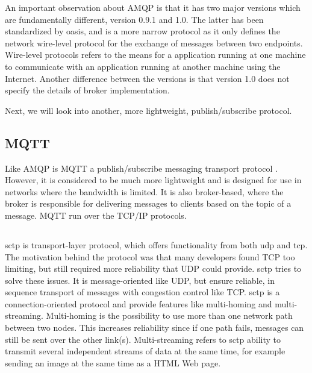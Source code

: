 An important observation about AMQP is that it has two major versions which are
fundamentally different, version 0.9.1 and 1.0. The latter has been standardized
by \gls{oasis}\cite{oasis-amqp}, and is a  more narrow protocol as it only defines the network
wire-level protocol for the exchange of messages between two endpoints.
Wire-level protocols refers to the means for a application running at one
machine to communicate with an application running at another machine using the
Internet. Another difference between the versions is that version 1.0 does not
specify the details of broker implementation.

Next, we will look into another, more lightweight, publish/subscribe protocol.

\subsection{MQTT}

Like AMQP is MQTT a publish/subscribe messaging transport protocol
\cite{oasis-mqtt}. However, it is considered to be much more lightweight and is
designed for use in networks where the bandwidth is limited. It is also
broker-based, where the broker is responsible for delivering messages to clients
based on the topic of a message. MQTT run over the TCP/IP protocols.



\subsection{}

\gls{sctp} is transport-layer protocol, which offers functionality from both
\gls{udp} and \gls{tcp}\cite{rfc-sctp}. The motivation behind the protocol was
that many developers found TCP too limiting, but still required more reliability
that UDP could provide. \gls{sctp} tries to solve these issues. It is
message-oriented like UDP, but ensure reliable, in sequence transport of
messages with congestion control like TCP. \gls{sctp} is a connection-oriented
protocol and provide features like multi-homing and multi-streaming.
Multi-homing is the possibility to use more than one network path between two
nodes. This increases reliability since if one path fails, messages can still be
sent over the other link(s). Multi-streaming refers to \gls{sctp} ability to
transmit several independent streams of data at the same time, for example
sending an image at the same time as a HTML Web page.

